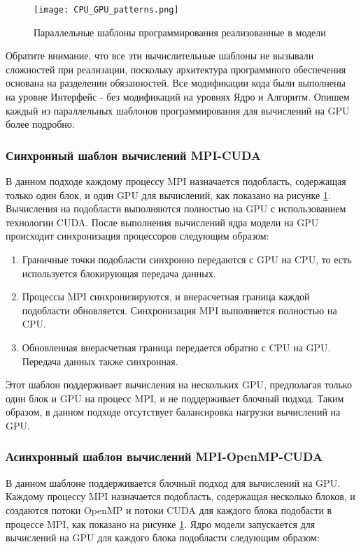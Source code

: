 \begin{figure}[!ht]
	\texttt{[image: CPU\_GPU\_patterns.png]}
	\vspace{3pt}
	\caption{Параллельные шаблоны программирования реализованные в модели}
	\label{fig:patterns}
\end{figure}

Обратите внимание, что все эти вычислительные шаблоны не вызывали сложностей при реализации, поскольку архитектура программного обеспечения основана на разделении обязанностей.
Все модификации кода были выполнены на уровне Интерфейс - без модификаций на уровнях Ядро и Алгоритм.
Опишем каждый из параллельных шаблонов программирования для вычислений на GPU более подробно.

\subsubsection{Синхронный шаблон вычислений MPI-CUDA}

В данном подходе каждому процессу MPI назначается подобласть, содержащая только один блок, и один GPU для вычислений, как показано на рисунке \ref{fig:patterns}. 
Вычисления на подобласти выполняются полностью на GPU с использованием технологии CUDA. 
После выполнения вычислений ядра модели на GPU происходит синхронизация процессоров следующим образом:

\begin{enumerate}
\item Граничные точки подобласти синхронно передаются с GPU на CPU, то есть используется блокирующая передача данных.
\item Процессы MPI синхронизируются, и внерасчетная граница каждой подобласти обновляется. Синхронизация MPI выполняется полностью на CPU.
\item Обновленная внерасчетная граница передается обратно с CPU на GPU. Передача данных также синхронная.
\end{enumerate}

Этот шаблон поддерживает вычисления на нескольких GPU, предполагая только один блок и GPU на процесс MPI, и не поддерживает блочный подход. 
Таким образом, в данном подходе отсутствует балансировка нагрузки вычислений на GPU.

\subsubsection{Асинхронный шаблон вычислений MPI-OpenMP-CUDA}

В данном шаблоне поддерживается блочный подход для вычислений на GPU. 
Каждому процессу MPI назначается подобласть, содержащая несколько блоков, и создаются потоки OpenMP и потоки CUDA для каждого блока подобасти в процессе MPI, как показано на рисунке \ref{fig:patterns}. 
Ядро модели запускается для вычислений на GPU для каждого блока подобласти следующим образом:

